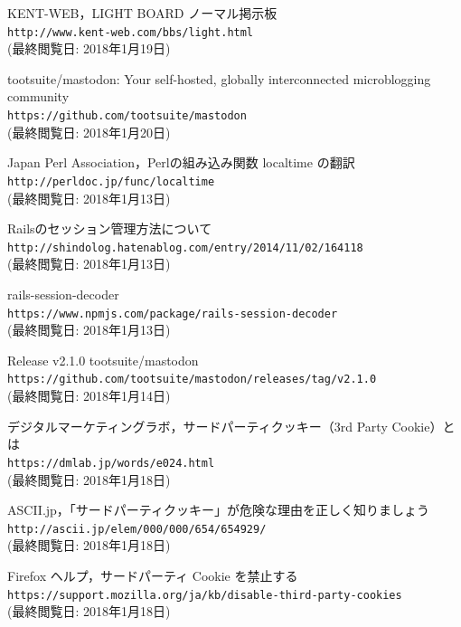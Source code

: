 \documentclass[10pt, a4paper]{jreport}
\begin{document}
\begin{thebibliography}{n}
 KENT-WEB，LIGHT BOARD ノーマル掲示板\\
\verb|http://www.kent-web.com/bbs/light.html|\\
(最終閲覧日: 2018年1月19日)

 tootsuite/mastodon: Your self-hosted, globally interconnected microblogging community\\
\verb|https://github.com/tootsuite/mastodon|\\
(最終閲覧日: 2018年1月20日)

 Japan Perl Association，Perlの組み込み関数 localtime の翻訳\\
\verb|http://perldoc.jp/func/localtime|\\
(最終閲覧日: 2018年1月13日)

 Railsのセッション管理方法について\\
\verb|http://shindolog.hatenablog.com/entry/2014/11/02/164118|\\
(最終閲覧日: 2018年1月13日)

 rails-session-decoder\\
\verb|https://www.npmjs.com/package/rails-session-decoder|\\
(最終閲覧日: 2018年1月13日)

 Release v2.1.0  tootsuite/mastodon\\
\verb|https://github.com/tootsuite/mastodon/releases/tag/v2.1.0|\\
(最終閲覧日: 2018年1月14日)

 デジタルマーケティングラボ，サードパーティクッキー（3rd Party Cookie）とは\\
\verb|https://dmlab.jp/words/e024.html|\\
(最終閲覧日: 2018年1月18日)

 ASCII.jp，「サードパーティクッキー」が危険な理由を正しく知りましょう\\
\verb|http://ascii.jp/elem/000/000/654/654929/|\\
(最終閲覧日: 2018年1月18日)

 Firefox ヘルプ，サードパーティ Cookie を禁止する\\
\verb|https://support.mozilla.org/ja/kb/disable-third-party-cookies|\\
(最終閲覧日: 2018年1月18日)


\end{thebibliography}
\end{document}
